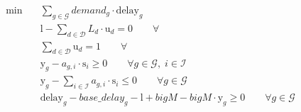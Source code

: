 \begin{align}
  \min\quad & \sum_{g \in \mathcal{G}} \mathit{demand}_{g} \cdot \text{delay}_{g} \tag{total\_delay} \\
  & \text{l} - \sum_{d \in \mathcal{D}} \mathit{L}_{d} \cdot \text{u}_{d} = 0 \qquad \forall  \tag{length\_selection} \\
  & \sum_{d \in \mathcal{D}} \text{u}_{d} = 1 \qquad \forall  \tag{scenario\_sum} \\
  & \text{y}_{g} - \mathit{a}_{g,i} \cdot \text{s}_{i} \ge 0 \qquad \forall g \in \mathcal{G},\; i \in \mathcal{I} \tag{affect\_def1} \\
  & \text{y}_{g} - \sum_{i \in \mathcal{I}} \mathit{a}_{g,i} \cdot \text{s}_{i} \le 0 \qquad \forall g \in \mathcal{G} \tag{affect\_def2} \\
  & \text{delay}_{g} - \mathit{base\_delay}_{g} - \text{l} + \mathit{bigM} - \mathit{bigM} \cdot \text{y}_{g} \ge 0 \qquad \forall g \in \mathcal{G} \tag{delay\_def}
\end{align}